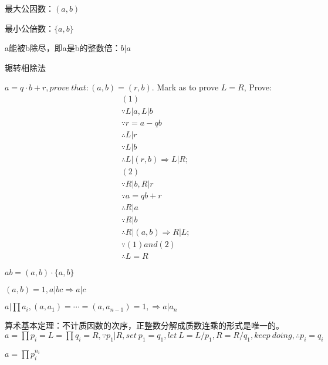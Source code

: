 \documentclass[UTF8]{../09-Mathematics}
\begin{document}
最大公因数：$(a, b)$

最小公倍数：$\{a, b\}$

a能被b除尽，即a是b的整数倍：$b|a$

辗转相除法

$a = q \cdot b + r, prove \ that:(a,b) = (r,b).$
Mark as to prove $L =R$, Prove:
\begin{equation}
    \begin{aligned}
        &(1)\\
        &\because L|a, L|b\\
        &\because r = a-qb\\
        &\therefore L|r\\
        &\because L|b\\
        &\therefore L|(r,b) \Rightarrow L|R;\\
        &(2)\\
        &\because R|b, R|r\\
        &\because a = qb + r\\
        &\therefore R|a\\
        &\because R|b\\
        &\therefore R|(a,b) \Rightarrow R|L;\\
        &\because (1) and (2)\\
        &\therefore L = R
    \end{aligned}
\end{equation}

\begin{proposition}
     $ab = (a,b) \cdot \{a, b\}$
\end{proposition}

\begin{proposition}
    $  (a,b) = 1, a|bc \Rightarrow a|c  $
\end{proposition}

\begin{proposition}
    $ a| \prod a_i,  (a,a_1) = \cdots =(a,a_{n-1}) = 1, \Rightarrow a|a_n  $
\end{proposition}

\begin{proposition}
    算术基本定理：不计质因数的次序，正整数分解成质数连乘的形式是唯一的。
    $a =\prod p_i = L =  \prod q_i = R, \because p_1 | R, set \  p_1 = q_1, let \ L = L / p_1, R = R / q_1, keep \ doing, \therefore p_i = q_i  $

    $a =\prod p_i^{n_i}  $

\end{proposition}
\end{document}
